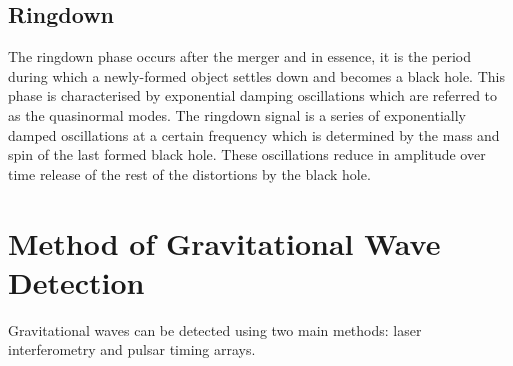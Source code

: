     \subsection{Ringdown} 
    The ringdown phase occurs after the merger and in essence, it is the period during which a newly-formed object settles down and becomes a black hole. This phase is characterised by exponential damping oscillations which are referred to as the quasinormal modes. The ringdown signal is a series of exponentially damped oscillations at a certain frequency which is determined by the mass and spin of the last formed black hole. These oscillations reduce in amplitude over time release of the rest of the distortions by the black hole.
\section{Method of Gravitational Wave Detection}
Gravitational waves can be detected using two main methods: laser interferometry and pulsar timing arrays.
    
